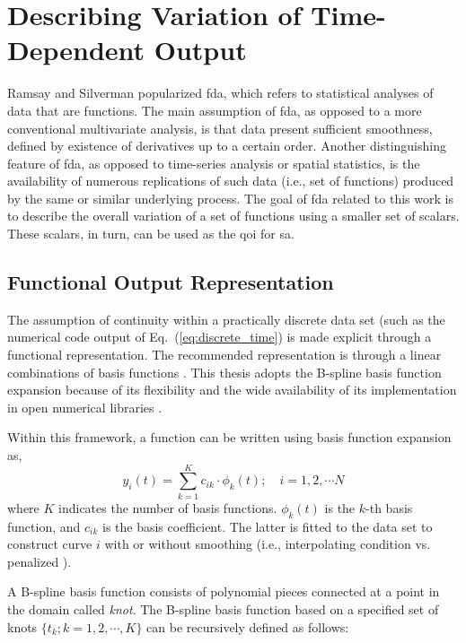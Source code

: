 \section{Describing Variation of Time-Dependent Output}\label{sec:sa_time_dependent_variation}

Ramsay and Silverman \cite{Ramsay2005} popularized \gls{fda}, which refers to statistical analyses of data that are functions.
The main assumption of \gls{fda}, as opposed to a more conventional multivariate analysis, is that data present sufficient smoothness, defined by existence of derivatives up to a certain order.
Another distinguishing feature of \gls{fda}, as opposed to time-series analysis or spatial statistics, is the availability of numerous replications of such data (i.e., set of functions) produced by the same or similar underlying process. 
The goal of \gls{fda} related to this work is to describe the overall variation of a set of functions using a smaller set of scalars.
These scalars, in turn, can be used as the \gls{qoi} for \gls{sa}.

\subsection{Functional Output Representation}\label{sub:sa_spline}

The assumption of continuity within a practically discrete data set (such as the numerical code output of Eq.~(\ref{eq:discrete_time}) is made explicit through a functional representation.
The recommended representation is through a linear combinations of basis functions \cite{Ramsay2005}.
This thesis adopts the B-spline basis function \cite{Gillies2010} expansion because of its flexibility \cite{Eilers1996,Eilers2010} 
and the wide availability of its implementation in open numerical libraries \cite{RCT2017}.

Within this framework, a function can be written using basis function expansion as,
\begin{equation}
	y_i (t) = \sum_{k = 1}^{K} c_{ik} \cdot \phi_k (t); \quad i = 1, 2, \cdots N
\label{eq:basis_function_expansion}
\end{equation}
where $K$ indicates the number of basis functions. $\phi_k (t)$ is the $k$-th basis function, 
and $c_{ik}$ is the basis coefficient.
The latter is fitted to the data set to construct curve $i$ with or without smoothing (i.e., interpolating condition vs. penalized ).

A B-spline basis function consists of polynomial pieces connected at a point in the domain called \emph{knot}.
The B-spline basis function based on a specified set of knots $\{t_k; k = 1, 2, \cdots, K\}$ can be recursively defined as follows:

